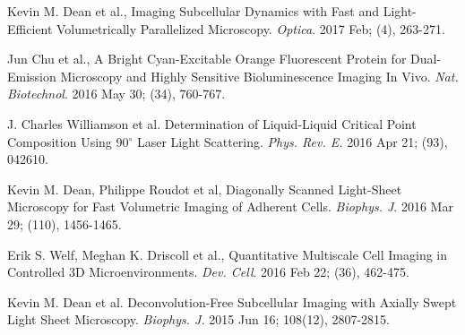 \documentclass[10pt]{res}
\begin{document}
\begin{resume}
\begin{etaremune}
\item Kevin M. Dean et al., Imaging Subcellular Dynamics with Fast and Light-Efficient Volumetrically Parallelized Microscopy. {\it Optica}.  2017 Feb; (4), 263-271.

\item Jun Chu et al.,  A Bright Cyan-Excitable Orange Fluorescent Protein for Dual-Emission Microscopy and Highly Sensitive Bioluminescence Imaging In Vivo.  {\it Nat. Biotechnol}. 2016 May 30; (34), 760-767.

\item J. Charles Williamson et al.  Determination of Liquid-Liquid Critical Point Composition Using 90$^{\circ}$ Laser Light Scattering. {\it Phys. Rev. E.}  2016 Apr 21; (93), 042610.

\item Kevin M. Dean, Philippe Roudot et al,  Diagonally Scanned Light-Sheet Microscopy for Fast Volumetric Imaging of Adherent Cells.  {\it Biophys. J}.  2016 Mar 29; (110), 1456-1465. 

\item Erik S. Welf, Meghan K. Driscoll et al., Quantitative Multiscale Cell Imaging in Controlled 3D Microenvironments. {\it Dev. Cell}.  2016 Feb 22; (36), 462-475. 

\item Kevin M. Dean et al.  Deconvolution-Free Subcellular Imaging with Axially Swept Light Sheet Microscopy.  {\it Biophys. J.} 2015 Jun 16; 108(12), 2807-2815.


\end{etaremune}
\end{resume}
\end{document}
